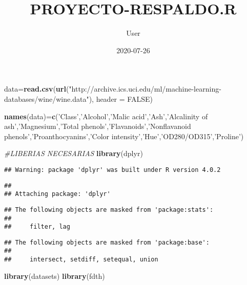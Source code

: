 \documentclass[
]{article}
\title{PROYECTO-RESPALDO.R}
\author{User}
\date{2020-07-26}
\newenvironment{Shaded}{\begin{snugshade}}{\end{snugshade}}
\newcommand{\CommentTok}[1]{\textcolor[rgb]{0.56,0.35,0.01}{\textit{#1}}}
\newcommand{\DataTypeTok}[1]{\textcolor[rgb]{0.13,0.29,0.53}{#1}}
\newcommand{\KeywordTok}[1]{\textcolor[rgb]{0.13,0.29,0.53}{\textbf{#1}}}
\newcommand{\NormalTok}[1]{#1}
\newcommand{\OtherTok}[1]{\textcolor[rgb]{0.56,0.35,0.01}{#1}}
\newcommand{\StringTok}[1]{\textcolor[rgb]{0.31,0.60,0.02}{#1}}
\begin{document}
\maketitle

\begin{Shaded}
\begin{Highlighting}[]
\NormalTok{data=}\KeywordTok{read.csv}\NormalTok{(}\KeywordTok{url}\NormalTok{(}\StringTok{"http://archive.ics.uci.edu/ml/machine-learning-databases/wine/wine.data"}\NormalTok{), }\DataTypeTok{header =} \OtherTok{FALSE}\NormalTok{)}

\KeywordTok{names}\NormalTok{(data)=}\KeywordTok{c}\NormalTok{(}\StringTok{'Class'}\NormalTok{,}\StringTok{'Alcohol'}\NormalTok{,}\StringTok{'Malic acid'}\NormalTok{,}\StringTok{'Ash'}\NormalTok{,}\StringTok{'Alcalinity of ash'}\NormalTok{,}\StringTok{'Magnesium'}\NormalTok{,}\StringTok{'Total phenols'}\NormalTok{,}\StringTok{'Flavanoids'}\NormalTok{,}\StringTok{'Nonflavanoid phenols'}\NormalTok{,}\StringTok{'Proanthocyanins'}\NormalTok{,}\StringTok{'Color intensity'}\NormalTok{,}\StringTok{'Hue'}\NormalTok{,}\StringTok{'OD280/OD315'}\NormalTok{,}\StringTok{'Proline'}\NormalTok{)}

\CommentTok{#LIBERIAS NECESARIAS }
\KeywordTok{library}\NormalTok{(dplyr)}
\end{Highlighting}
\end{Shaded}

\begin{verbatim}
## Warning: package 'dplyr' was built under R version 4.0.2
\end{verbatim}

\begin{verbatim}
## 
## Attaching package: 'dplyr'
\end{verbatim}

\begin{verbatim}
## The following objects are masked from 'package:stats':
## 
##     filter, lag
\end{verbatim}

\begin{verbatim}
## The following objects are masked from 'package:base':
## 
##     intersect, setdiff, setequal, union
\end{verbatim}

\begin{Shaded}
\begin{Highlighting}[]
\KeywordTok{library}\NormalTok{(datasets)}
\KeywordTok{library}\NormalTok{(fdth)}
\end{Highlighting}
\end{Shaded}
\end{document}
